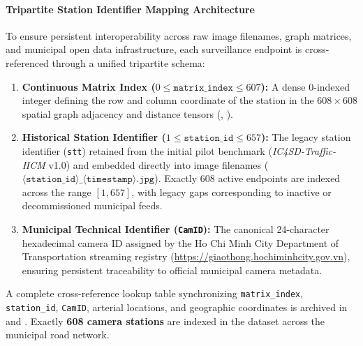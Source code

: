 \documentclass[preprint,12pt]{elsarticle}
\begin{document}
\paragraph{Tripartite Station Identifier Mapping Architecture}
To ensure persistent interoperability across raw image filenames, graph matrices, and municipal open data infrastructure, each surveillance endpoint is cross-referenced through a unified tripartite schema:
\begin{enumerate}
    \item \textbf{Continuous Matrix Index ($0 \le \texttt{matrix\_index} \le 607$):} A dense 0-indexed integer defining the row and column coordinate of the station in the $608 \times 608$ spatial graph adjacency and distance tensors (, ).
    \item \textbf{Historical Station Identifier ($1 \le \texttt{station\_id} \le 657$):} The legacy station identifier (\texttt{stt}) retained from the initial pilot benchmark (\textit{IC4SD-Traffic-HCM} v1.0) and embedded directly into image filenames ($\langle\texttt{station\_id}\rangle\mathbin{\_}\langle\texttt{timestamp}\rangle\texttt{.jpg}$). Exactly 608 active endpoints are indexed across the range $[1, 657]$, with legacy gaps corresponding to inactive or decommissioned municipal feeds.
    \item \textbf{Municipal Technical Identifier (\texttt{CamID}):} The canonical 24-character hexadecimal camera ID assigned by the Ho Chi Minh City Department of Transportation streaming registry (\url{https://giaothong.hochiminhcity.gov.vn}), ensuring persistent traceability to official municipal camera metadata.
\end{enumerate}
A complete cross-reference lookup table synchronizing \texttt{matrix\_index}, \texttt{station\_id}, \texttt{CamID}, arterial locations, and geographic coordinates is archived in  and . Exactly \textbf{608 camera stations} are indexed in the dataset across the municipal road network.
\end{document}
